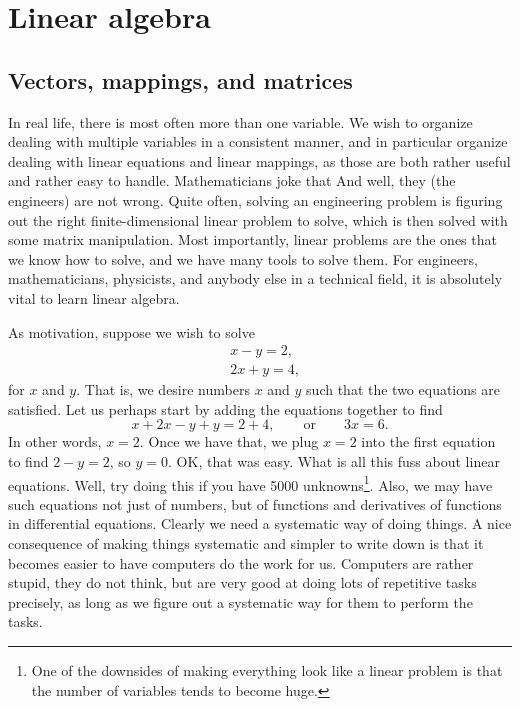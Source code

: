 \chapter{Linear algebra} \label{linalg:appendix}


\section{Vectors, mappings, and matrices}
\label{vecsandmaps:section}


In real life, there is most often more than one variable.
We wish to organize dealing with multiple variables in a consistent
manner, and in particular organize dealing with linear equations and linear
mappings, as those are both rather useful and rather easy to handle.
Mathematicians joke that
And well, they (the engineers) are not wrong. 
Quite often, solving an engineering problem is figuring out the
right finite-dimensional linear problem to solve, which is then
solved with some matrix manipulation.
Most importantly, linear problems are the ones that we know how to solve,
and we have many tools to solve them.
For engineers, mathematicians, physicists, and anybody else in a technical
field, it is absolutely vital to learn linear algebra.

As motivation, suppose we wish to solve
\begin{equation*}
\begin{aligned}
& x-y = 2 , \\
& 2x+y = 4 ,
\end{aligned}
\end{equation*}
for $x$ and $y$.
That is, we desire numbers $x$ and $y$ such that the two
equations are satisfied.
Let us perhaps start by adding the equations together to find
\begin{equation*}
x+2x-y+y = 2+4, \qquad \text{or} \qquad 3x = 6 .
\end{equation*}
In other words, $x=2$.  Once we have that, we plug $x=2$ into the
first equation to find $2-y=2$, so $y=0$.  OK\@, that was easy.  What is all
this fuss about linear equations.  Well, try doing this if you have
5000 unknowns\footnote{One of the downsides of making everything look like a
linear problem is that the number of variables tends to become huge.}.
Also, we may have such equations not just of numbers,
but of functions and derivatives of functions in differential equations.
Clearly we need a systematic way of doing things.
A nice consequence of making things systematic and simpler to write down
is that it becomes easier to have computers do the work for us.
Computers are rather stupid, they do not think,
but are very good at doing lots of repetitive
tasks precisely, as long as we figure out a systematic way for them to
perform the tasks.

